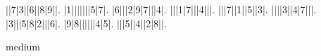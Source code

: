 \begin{sudoku}
||7|3||6||8|9||.
|1|||||||5|7|.
|6|||2|9|7|||4|.
|||1|7|||4|||.
|||7||1||5||3|.
||||3||4|7|||.
|3|||5|8|2|||6|.
|9|8||||||4|5|.
|||5||4||2|8||.
\end{sudoku}
\begin{center}
medium\end{center}